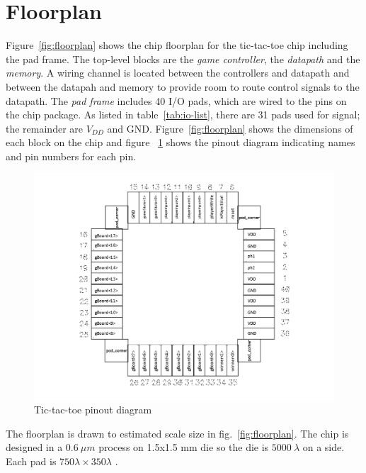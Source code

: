 \documentclass[]{article}
\begin{document}
\section{Floorplan}
\label{sec:floorplan}
Figure~\ref{fig:floorplan} shows the chip floorplan for the tic-tac-toe chip including the pad frame. The top-level blocks are the \emph{game controller}, the \emph{datapath} and the \emph{memory}. A wiring channel is located between the controllers and datapath and between the datapah and memory to provide room to route control signals to the datapath. The \emph{pad frame} includes 40 I/O pads, which are wired to the pins on the chip package. As listed in table~\ref{tab:io-list}, there are 31 pads used for signal; the remainder are $V_{DD}$ and GND. Figure~\ref{fig:floorplan} shows the dimensions of each block on the chip and figure ~\ref{fig:pinout} shows the pinout diagram indicating names and pin numbers for each pin.

\begin{figure}
\centering
\includegraphics[width=.8\textwidth]{pinout}
\caption{Tic-tac-toe pinout diagram}
\label{fig:pinout}
\end{figure}

The floorplan is drawn to estimated scale size in fig.~\ref{fig:floorplan}. The chip is designed in a $0.6~\mu m$ process on 1.5x1.5 mm die so the die is $5000~\lambda$
on a side. Each pad is $750 \lambda \times 350 \lambda$
\cite{e85-book}.
\end{document}
